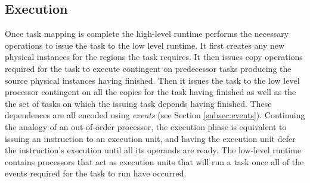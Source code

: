 \subsection{Execution}
\label{subsec:execution}
Once task mapping is complete the high-level runtime performs the necessary operations
to issue the task to the low level runtime.  It first creates any new physical instances
for the regions the task requires.  It then issues copy operations required
for the task to execute contingent on predecessor tasks producing the source physical instances
having finished.  Then it issues the task to the low level processor contingent
on all the copies for the task having finished as well as the the set of tasks
on which the issuing task depends having finished.  These dependences are all encoded
using {\em events} (see Section \ref{subsec:events}).  Continuing the analogy of an out-of-order
processor, the execution phase is equivalent to issuing an instruction to an
execution unit, and having the execution unit defer the instruction's execution until all its
operands are ready.  The low-level runtime contains processors that act as execution
units that will run a task once all of the events required for the task to run
have occurred. 




